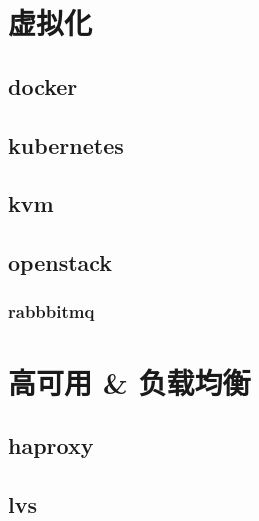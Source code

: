\documentclass[letterpaper,10pt,english]{sphinxmanual}
\begin{document}
\chapter{虚拟化}
\label{\detokenize{virtualization/readme:id1}}\label{\detokenize{virtualization/readme::doc}}

\section{docker}
\label{\detokenize{virtualization/docker:docker}}\label{\detokenize{virtualization/docker::doc}}

\section{kubernetes}
\label{\detokenize{virtualization/kubernetes:kubernetes}}\label{\detokenize{virtualization/kubernetes::doc}}

\section{kvm}
\label{\detokenize{virtualization/kvm:kvm}}\label{\detokenize{virtualization/kvm::doc}}

\section{openstack}
\label{\detokenize{virtualization/openstack/readme:openstack}}\label{\detokenize{virtualization/openstack/readme::doc}}

\subsection{rabbbitmq}
\label{\detokenize{virtualization/openstack/rabbitmq:rabbbitmq}}\label{\detokenize{virtualization/openstack/rabbitmq::doc}}

\chapter{高可用 \& 负载均衡}
\label{\detokenize{ha_lb/readme:id1}}\label{\detokenize{ha_lb/readme::doc}}

\section{haproxy}
\label{\detokenize{ha_lb/haproxy:haproxy}}\label{\detokenize{ha_lb/haproxy::doc}}

\section{lvs}
\label{\detokenize{ha_lb/lvs:lvs}}\label{\detokenize{ha_lb/lvs::doc}}
\end{document}
